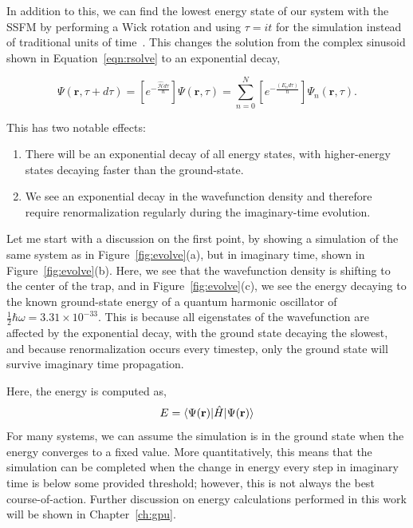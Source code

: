 In addition to this, we can find the lowest energy state of our system with the SSFM by performing a Wick rotation and using $\tau = it$ for the simulation instead of traditional units of time~\cite{wick1954}.
This changes the solution from the complex sinusoid shown in Equation~\eqref{eqn:rsolve} to an exponential decay,

\begin{equation}
\Psi(\mathbf{r},\tau + d\tau) = \left[e^{-\frac{\mathcal{\hat{H}}d\tau}{\hbar}}\right]\Psi(\mathbf{r},\tau) = \sum_{n=0}^N\left[e^{-\frac{(E_n d\tau)}{\hbar}}\right]\Psi_n(\mathbf{r},\tau).
\end{equation}

\noindent This has two notable effects:
\begin{enumerate}
\item There will be an exponential decay of all energy states, with higher-energy states decaying faster than the ground-state.
\item We see an exponential decay in the wavefunction density and therefore require renormalization regularly during the imaginary-time evolution.
\end{enumerate}
Let me start with a discussion on the first point, by showing a simulation of the same system as in Figure~\ref{fig:evolve}(a), but in imaginary time, shown in Figure~\ref{fig:evolve}(b).
Here, we see that the wavefunction density is shifting to the center of the trap, and
in Figure~\ref{fig:evolve}(c), we see the energy decaying to the known ground-state energy of a quantum harmonic oscillator of $\frac{1}{2}\hbar\omega = 3.31\times 10^{-33}$.
This is because all eigenstates of the wavefunction are affected by the exponential decay, with the ground state decaying the slowest, and because renormalization occurs every timestep, only the ground state will survive imaginary time propagation.

Here, the energy is computed as,
\begin{equation}
E = \braket{\Psi(\mathbf{r})|\hat H|\Psi(\mathbf{r})}
\label{eqn:energy}
\end{equation}
For many systems, we can assume the simulation is in the ground state when the energy converges to a fixed value.
More quantitatively, this means that the simulation can be completed when the change in energy every step in imaginary time is below some provided threshold; however, this is not always the best course-of-action.
Further discussion on energy calculations performed in this work will be shown in Chapter~\ref{ch:gpu}.

